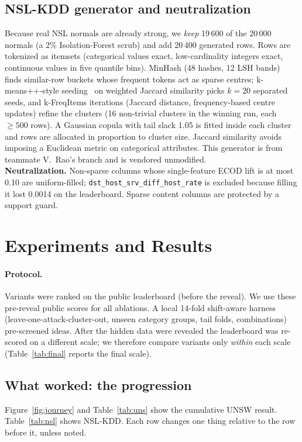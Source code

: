 \documentclass[10pt,a4paper]{article}
\begin{document}
\subsection{NSL-KDD generator and neutralization}
Because real NSL normals are already strong, we \emph{keep} 19\,600 of the 20\,000 normals (a 2\% Isolation-Forest scrub) and add 20\,400 generated rows. Rows are tokenized as itemsets (categorical values exact, low-cardinality integers exact, continuous values in five quantile bins). MinHash (48 hashes, 12 LSH bands)~\cite{minhash} finds similar-row buckets whose frequent tokens act as sparse centres; k-means++-style seeding~\cite{kmpp} on weighted Jaccard similarity picks $k=20$ separated seeds, and k-FreqItems iterations (Jaccard distance, frequency-based centre updates) refine the clusters (16 non-trivial clusters in the winning run, each $\ge500$ rows). A Gaussian copula with tail slack 1.05 is fitted inside each cluster and rows are allocated in proportion to cluster size. Jaccard similarity avoids imposing a Euclidean metric on categorical attributes. This generator is from teammate V.\ Rao's branch and is vendored unmodified.\\
\textbf{Neutralization.} Non-sparse columns whose single-feature ECOD lift is at most 0.10 are uniform-filled; \texttt{dst\_host\_srv\_diff\_host\_rate} is excluded because filling it lost 0.0014 on the leaderboard. Sparse content columns are protected by a support guard.

\section{Experiments and Results}\label{sec:exp}
\paragraph{Protocol.} Variants were ranked on the public leaderboard (before the reveal). We use these pre-reveal public scores for all ablations. A local 14-fold shift-aware harness (leave-one-attack-cluster-out, unseen category groups, tail folds, combinations) pre-screened ideas. After the hidden data were revealed the leaderboard was re-scored on a different scale; we therefore compare variants only \emph{within} each scale (Table~\ref{tab:final} reports the final scale).

\subsection{What worked: the progression}
Figure~\ref{fig:journey} and Table~\ref{tab:uns} show the cumulative UNSW result. Table~\ref{tab:nsl} shows NSL-KDD. Each row changes one thing relative to the row before it, unless noted.
\end{document}
